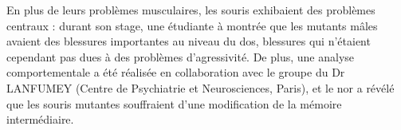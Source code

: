 	En plus de leurs problèmes musculaires, les souris \mcrd exhibaient des problèmes centraux : durant son stage, une étudiante à montrée que les mutants mâles avaient des blessures importantes au niveau du dos, blessures qui n'étaient cependant pas dues à des problèmes d'agressivité. De plus, une analyse comportementale a été réalisée en collaboration avec le groupe du Dr LANFUMEY (Centre de Psychiatrie et Neurosciences, Paris), et le \gls{nor} a révélé que les souris mutantes souffraient d'une modification de la mémoire intermédiaire.
		
